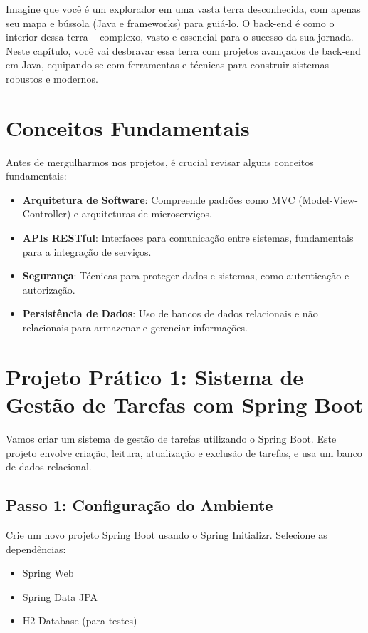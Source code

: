 \documentclass[a4paper,12pt]{book}
\begin{document}
Imagine que você é um explorador em uma vasta terra desconhecida, com apenas seu mapa e bússola (Java e frameworks) para guiá-lo. O back-end é como o interior dessa terra – complexo, vasto e essencial para o sucesso da sua jornada. Neste capítulo, você vai desbravar essa terra com projetos avançados de back-end em Java, equipando-se com ferramentas e técnicas para construir sistemas robustos e modernos.

\section{Conceitos Fundamentais}

Antes de mergulharmos nos projetos, é crucial revisar alguns conceitos fundamentais:

\begin{itemize}
    \item \textbf{Arquitetura de Software}: Compreende padrões como MVC (Model-View-Controller) e arquiteturas de microserviços.
    \item \textbf{APIs RESTful}: Interfaces para comunicação entre sistemas, fundamentais para a integração de serviços.
    \item \textbf{Segurança}: Técnicas para proteger dados e sistemas, como autenticação e autorização.
    \item \textbf{Persistência de Dados}: Uso de bancos de dados relacionais e não relacionais para armazenar e gerenciar informações.
\end{itemize}

\section{Projeto Prático 1: Sistema de Gestão de Tarefas com Spring Boot}

Vamos criar um sistema de gestão de tarefas utilizando o Spring Boot. Este projeto envolve criação, leitura, atualização e exclusão de tarefas, e usa um banco de dados relacional.

\subsection{Passo 1: Configuração do Ambiente}

Crie um novo projeto Spring Boot usando o Spring Initializr. Selecione as dependências:
\begin{itemize}
    \item Spring Web
    \item Spring Data JPA
    \item H2 Database (para testes)
\end{itemize}
\end{document}
